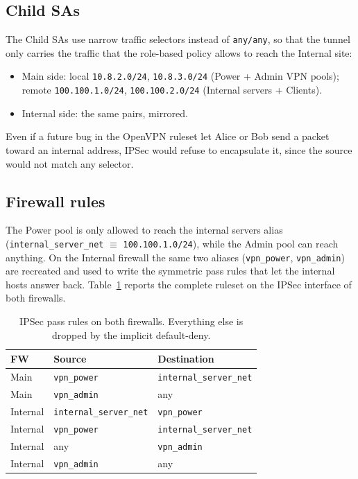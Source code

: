 \documentclass[twocolumn]{NobArticle}
\begin{document}
\subsection{Child SAs}

The Child SAs use narrow traffic selectors instead of \texttt{any/any},
so that the tunnel only carries the traffic that the role-based policy
allows to reach the Internal site:

\begin{itemize}
    \item Main side: local \texttt{10.8.2.0/24}, \texttt{10.8.3.0/24}
    (Power + Admin VPN pools);\\
    remote \texttt{100.100.1.0/24}, \texttt{100.100.2.0/24} (Internal
    servers + Clients).
    \item Internal side: the same pairs, mirrored.
\end{itemize}

Even if a future bug in the OpenVPN ruleset let Alice or Bob send a
packet toward an internal address, IPSec would refuse to encapsulate it,
since the source would not match any selector.

\subsection{Firewall rules}

The Power pool is only allowed to reach the internal servers alias
(\texttt{internal\_server\_net} $\equiv$ \texttt{100.100.1.0/24}), while
the Admin pool can reach anything. On the Internal firewall the same
two aliases (\texttt{vpn\_power}, \texttt{vpn\_admin}) are recreated and
used to write the symmetric pass rules that let the internal hosts
answer back. Table~\ref{tab:ipsecrules} reports the complete ruleset on
the IPSec interface of both firewalls.

\begin{table}[H]
\centering
\begin{tabular}{lll}
\toprule
\textbf{FW} & \textbf{Source} & \textbf{Destination} \\
\midrule
Main     & \texttt{vpn\_power} & \texttt{internal\_server\_net} \\
Main     & \texttt{vpn\_admin} & any \\
\midrule
Internal & \texttt{internal\_server\_net} & \texttt{vpn\_power} \\
Internal & \texttt{vpn\_power}            & \texttt{internal\_server\_net} \\
Internal & any                            & \texttt{vpn\_admin} \\
Internal & \texttt{vpn\_admin}            & any \\
\bottomrule
\end{tabular}
\caption{IPSec pass rules on both firewalls. Everything else is dropped
by the implicit default-deny.}
\label{tab:ipsecrules}
\end{table}
\end{document}
